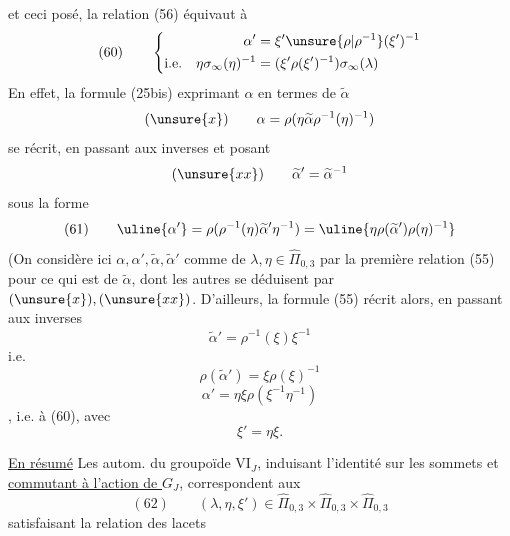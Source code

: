 et ceci posé, la relation (56) équivaut à
\[
(60)\qquad\left\{\begin{aligned}
\alpha'&=\xi'\unsure{\rho|\rho^{-1}}(\xi')^{-1}\\
\text{i.e.}\quad\eta\sigma_\infty(\eta)^{-1}&=(\xi'\rho(\xi')^{-1})\sigma_\infty(\lambda)
\end{aligned}\right.
\]
\quad{}
En effet, la formule (25bis) exprimant $\alpha$ en termes de $\widetilde\alpha$
\[
(\unsure{x})\qquad\alpha=\rho(\eta\widetilde\alpha\rho^{-1}(\eta)^{-1})
\]
se récrit, en passant aux inverses et posant
\[
(\unsure{xx})\qquad\widetilde\alpha'=\widetilde\alpha^{-1}
\]
sous la forme
\[
(61)\qquad\uline{\alpha'}=\rho(\rho^{-1}(\eta)\widetilde\alpha'\eta^{-1})
=\uline{\eta\rho(\widetilde\alpha')\rho(\eta)^{-1}}
\]
(On considère ici $\alpha,\alpha',\widetilde\alpha,\widetilde\alpha'$ comme  de $\lambda,\eta\in\widehat\Pi_{0,3}$ par la première relation (55) pour ce qui est de $\widetilde\alpha$, dont les autres se déduisent par $(\unsure{x}),(\unsure{xx})$. D'ailleurs, la  formule (55)  récrit alors, en passant aux inverses
\[
\widetilde\alpha'=\rho^{-1}(\xi)\xi^{-1}
\]
i.e.
\[
\rho(\widetilde\alpha')=\xi\rho(\xi)^{-1}
\]
\[
\alpha'=\eta\xi\rho(\xi^{-1}\eta^{-1})
\]
,
i.e. à (60), avec
\[
\xi'=\eta\xi.
\]

\uline{En résumé} Les autom. du groupoïde $\mathrm{VI}_J$, induisant l'identité sur les sommets et \uline{commutant à l'action de $G_J$}, correspondent aux
\[
(62)\qquad\boxed{(\lambda,\eta,\xi')\in\widehat\Pi_{0,3}\times\widehat\Pi_{0,3}\times\widehat\Pi_{0,3}}
\]
satisfaisant la relation des lacets 
